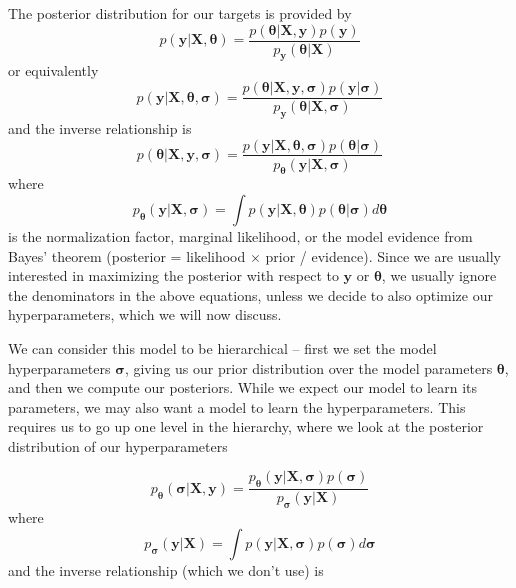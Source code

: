 \documentclass{article}
\begin{document}
The posterior distribution for our targets is provided by  \begin{equation} p(\mathbf{y}|\mathbf{X}, \boldsymbol{\theta})=\frac{p(\boldsymbol{\theta}|\mathbf{X},\mathbf{y})p(\mathbf{y})}{p_\mathbf{y}(\boldsymbol{\theta}|\mathbf{X})}\end{equation}or equivalently \begin{equation} p(\mathbf{y}|\mathbf{X}, \boldsymbol{\theta},\boldsymbol{\sigma})=\frac{p(\boldsymbol{\theta}|\mathbf{X},\mathbf{y},\boldsymbol{\sigma})p(\mathbf{y}|\boldsymbol{\sigma})}{p_\mathbf{y}(\boldsymbol{\theta}|\mathbf{X},\boldsymbol{\sigma})}\end{equation}and the inverse relationship is
\begin{equation}    p(\boldsymbol{\theta}|\mathbf{X},\mathbf{y},\boldsymbol{\sigma})=\frac{p(\mathbf{y}|\mathbf{X},\boldsymbol{\theta},\boldsymbol{\sigma})p(\boldsymbol{\theta}|\boldsymbol{\sigma})}{p_{\boldsymbol{\theta}}(\mathbf{y}|\mathbf{X},\boldsymbol{\sigma})}
\end{equation}where
\begin{equation}
\label{eq:define_marginal_likelihood}
  p_{\boldsymbol{\theta}}(\mathbf{y}|\mathbf{X},\boldsymbol{\sigma})=\int p(\mathbf{y}|\mathbf{X},\boldsymbol{\theta})p(\boldsymbol{\theta}|\boldsymbol{\sigma})d\boldsymbol{\theta}
\end{equation}is the normalization factor, marginal likelihood, or the model evidence from Bayes' theorem (posterior = likelihood $\times$ prior / evidence). Since we are usually interested in maximizing the posterior with respect to $\mathbf{y}$ or $\boldsymbol{\theta}$, we usually ignore the denominators in the above equations, unless we decide to also optimize our hyperparameters, which we will now discuss.

We can consider this model to be hierarchical -- first we set the model hyperparameters $\boldsymbol{\sigma}$, giving us our prior distribution  over the model parameters $\boldsymbol{\theta}$, and then we compute our posteriors. While we expect our model to learn its parameters, we may also want a model to learn the hyperparameters. This requires us to go up one level in the hierarchy, where we look at the posterior distribution of our hyperparameters

\begin{equation}
\label{eq:posterior_sigma}
    p_{\boldsymbol{\theta}}(\boldsymbol{\sigma}|\mathbf{X},\mathbf{y})=\frac{p_\boldsymbol{\theta}(\mathbf{y}|\mathbf{X},\boldsymbol{\sigma})p(\boldsymbol{\sigma})}{p_{\boldsymbol{\sigma}}(\mathbf{y}|\mathbf{X})}
\end{equation}where
\begin{equation}
\label{eq:marginal_marginal_likelihood}
   p_{\boldsymbol{\sigma}}(\mathbf{y}|\mathbf{X})=\int p(\mathbf{y}|\mathbf{X},\boldsymbol{\sigma})p(\boldsymbol{\sigma})d\boldsymbol{\sigma}
\end{equation}and the inverse relationship (which we don't use) is 
\end{document}
